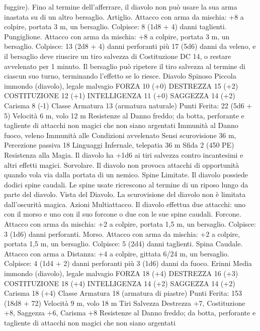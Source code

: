 \begin{multicols}{2}
fuggire). Fino al termine dell’afferrare, il diavolo non può usare
la sua arma inastata su di un altro bersaglio.
Artiglio. Attacco con arma da mischia: +8 a colpire, portata 3 m,
un bersaglio.
Colpisce: 8 (1d8 + 4) danni taglienti.
Pungiglione. Attacco con arma da mischia: +8 a colpire, portata
3 m, un bersaglio.
Colpisce: 13 (2d8 + 4) danni perforanti più 17 (5d6) danni da
veleno, e il bersaglio deve riuscire un tiro salvezza di
Costituzione DC 14, o restare avvelenato per 1 minuto. Il
bersaglio può ripetere il tiro salvezza al termine di ciascun suo
turno, terminando l’effetto se lo riesce.
Diavolo Spinoso
Piccola immondo (diavolo), legale malvagio
FORZA 10 (+0)
DESTREZZA 15 (+2)
COSTITUZIONE 12 (+1)
INTELLIGENZA 11 (+0)
SAGGEZZA 14 (+2)
Carisma 8 (-1)
Classe Armatura 13 (armatura naturale)
\hspace*{0pt}\hfill{Punti Ferita}: 22 (5d6 + 5)
Velocità 6 m, volo 12 m
Resistenze al Danno freddo; da botta, perforante e tagliente
di attacchi non magici che non siano argentati
Immunità al Danno fuoco, veleno
Immunità alle Condizioni avvelenato
Sensi scurovisione 36 m, Percezione passiva 18
Linguaggi Infernale, telepatia 36 m
Sfida 2 (450 PE)
Resistenza alla Magia. Il diavolo ha +1d6 ai tiri salvezza
contro incantesimi e altri effetti magici.
Sorvolare. Il diavolo non provoca attacchi di opportunità quando
vola via dalla portata di un nemico.
Spine Limitate. Il diavolo possiede dodici spine caudali. Le
spine usate ricrescono al termine di un riposo lungo da parte del
diavolo.
Vista del Diavolo. La scurovisione del diavolo non è limitata
dall’oscurità magica.
Azioni
Multiattacco. Il diavolo effettua due attacchi: uno con il morso e
uno con il suo forcone o due con le sue spine caudali.
Forcone. Attacco con arma da mischia: +2 a colpire, portata 1,5
m, un bersaglio.
Colpisce: 3 (1d6) danni perforanti.
Morso. Attacco con arma da mischia: +2 a colpire, portata 1,5
m, un bersaglio.
Colpisce: 5 (2d4) danni taglienti.
Spina Caudale. Attacco con arma a Distanza: +4 a colpire,
gittata 6/24 m, un bersaglio.
Colpisce: 4 (1d4 + 2) danni perforanti più 3 (1d6) danni da
fuoco.
Erinni
Media immondo (diavolo), legale malvagio
FORZA 18 (+4)
DESTREZZA 16 (+3)
COSTITUZIONE 18 (+4)
INTELLIGENZA 14 (+2)
SAGGEZZA 14 (+2)
Carisma 18 (+4)
Classe Armatura 18 (armatura di piastre)
\hspace*{0pt}\hfill{Punti Ferita}: 153 (18d8 + 72)
Velocità 9 m, volo 18 m
Tiri Salvezza Destrezza +7, Costituzione +8, Saggezza +6,
Carisma +8
Resistenze al Danno freddo; da botta, perforante e tagliente
di attacchi non magici che non siano argentati

\end{multicols}
